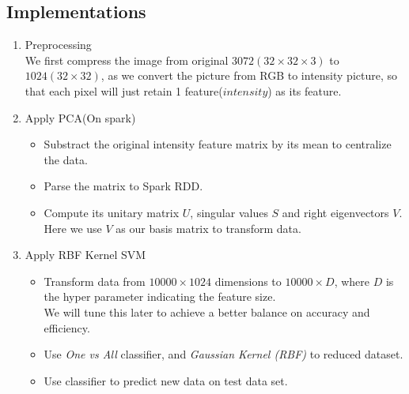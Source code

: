 \documentclass[a4paper]{article}
\begin{document}
\subsection{Implementations}
\begin{enumerate}
\item Preprocessing\\
We first compress the image from original $3072(32 \times 32 \times 3)$ to $1024 (32 \times 32)$, as we convert the picture from RGB to intensity picture, so that each pixel will just retain 1 feature($intensity$) as its feature.
\item Apply PCA(On spark)
\begin{itemize}
\item Substract the original intensity feature matrix by its mean to centralize the data.
\item Parse the matrix to Spark RDD.
\item Compute its unitary matrix $U$, singular values $S$ and right eigenvectors $V$.\\
Here we use $V$ as our basis matrix to transform data.
\end{itemize}
\item Apply RBF Kernel SVM
\begin{itemize}
\item Transform data from $10000 \times 1024$ dimensions to $10000 \times D$, where $D$ is the hyper parameter indicating the feature size.\\
We will tune this later to achieve a better balance on accuracy and efficiency. 
\item Use \textit{One vs All} classifier, and \textit{Gaussian Kernel (RBF)} to reduced dataset.
\item Use classifier to predict new data on test data set.
\end{itemize}
\end{enumerate}
\end{document}
